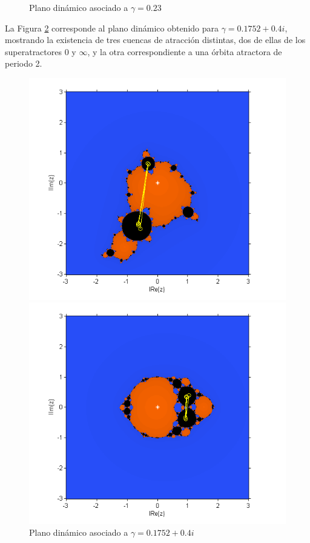 \begin{figure}[h!!!]
\begin{minipage}[m]{0.5\linewidth}
		\caption{Plano dinámico asociado a $\gamma=0.23$}\label{puntofijo1}
	\end{minipage}
\end{figure}

La Figura \ref{cardioide} corresponde al plano dinámico obtenido para $\gamma=0.1752+0.4i$, mostrando la existencia de tres cuencas de atracción distintas, dos de ellas de los superatractores $0$ y $\infty$, y la otra correspondiente a una órbita atractora de periodo 2.

\begin{figure}[h!!!]
	\begin{minipage}[m]{0.5\linewidth}%
		\centering \includegraphics[width=\linewidth]{cardioide.png}
		\caption{Plano dinámico asociado a $\gamma=0.1752+0.4i$}\label{cardioide}
	\end{minipage}
	\begin{minipage}[m]{0.5\linewidth}%
		\centering \includegraphics[width=\linewidth]{rightcircle.png}

\end{minipage}
\end{figure}
